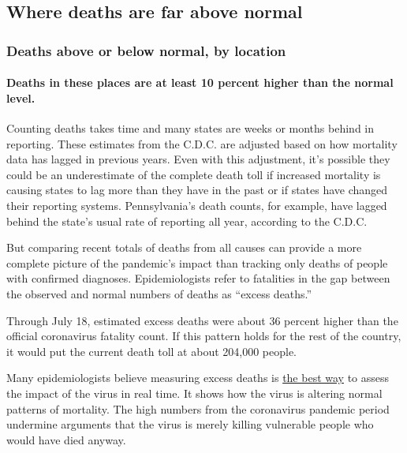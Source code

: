 \hypertarget{where-deaths-are-far-above-normal}{%
\subsection{Where deaths are far above
normal}\label{where-deaths-are-far-above-normal}}

\hypertarget{deaths-above-or-below-normal-by-location}{%
\subsubsection{Deaths above or below normal, by
location}\label{deaths-above-or-below-normal-by-location}}

\hypertarget{deaths-in-these-places-are-at-least-10-percent-higher-than-the-normal-level}{%
\paragraph{Deaths in these places are at least 10 percent higher than
the normal
level.}\label{deaths-in-these-places-are-at-least-10-percent-higher-than-the-normal-level}}

Counting deaths takes time and many states are weeks or months behind in
reporting. These estimates from the C.D.C. are adjusted based on how
mortality data has lagged in previous years. Even with this adjustment,
it's possible they could be an underestimate of the complete death toll
if increased mortality is causing states to lag more than they have in
the past or if states have changed their reporting systems.
Pennsylvania's death counts, for example, have lagged behind the state's
usual rate of reporting all year, according to the C.D.C.

But comparing recent totals of deaths from all causes can provide a more
complete picture of the pandemic's impact than tracking only deaths of
people with confirmed diagnoses. Epidemiologists refer to fatalities in
the gap between the observed and normal numbers of deaths as ``excess
deaths.''

Through July 18, estimated excess deaths were about 36 percent higher
than the official coronavirus fatality count. If this pattern holds for
the rest of the country, it would put the current death toll at about
204,000 people.

Many epidemiologists believe measuring excess deaths is
\href{https://www.thelancet.com/journals/lancet/article/PIIS0140-6736(20)30933-8/fulltext}{the
best way} to assess the impact of the virus in real time. It shows how
the virus is altering normal patterns of mortality. The high numbers
from the coronavirus pandemic period undermine arguments that the virus
is merely killing vulnerable people who would have died anyway.

